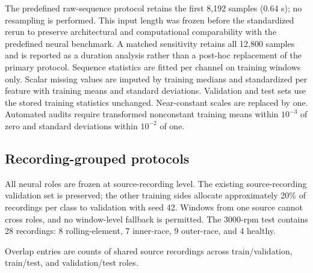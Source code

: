 \documentclass[machines,article,submit,oneauthor]{Definitions/mdpi}
\begin{document}
The predefined raw-sequence protocol retains the first 8,192 samples (0.64 s); no resampling is performed. This input length was frozen before the standardized rerun to preserve architectural and computational comparability with the predefined neural benchmark. A matched sensitivity retains all 12,800 samples and is reported as a duration analysis rather than a post-hoc replacement of the primary protocol. Sequence statistics are fitted per channel on training windows only. Scalar missing values are imputed by training medians and standardized per feature with training means and standard deviations. Validation and test sets use the stored training statistics unchanged. Near-constant scales are replaced by one. Automated audits require transformed nonconstant training means within $10^{-3}$ of zero and standard deviations within $10^{-2}$ of one.

\subsection{Recording-grouped protocols}
All neural roles are frozen at source-recording level. The existing source-recording validation set is preserved; the other training sides allocate approximately 20\% of recordings per class to validation with seed 42. Windows from one source cannot cross roles, and no window-level fallback is permitted. The 3000-rpm test contains 28 recordings: 8 rolling-element, 7 inner-race, 9 outer-race, and 4 healthy.


\begin{table}[H]
\centering
\caption{Frozen recording-grouped neural evaluation roles.}
\label{tab:splits}
\small
{}
\vspace{0.3em}\parbox{\textwidth}{\footnotesize Overlap entries are counts of shared source recordings across train/validation, train/test, and validation/test roles.}
\end{table}
\end{document}
